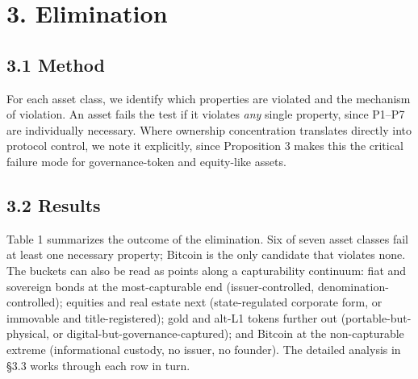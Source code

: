 \documentclass[12pt]{article}
\theoremstyle{definition}
\theoremstyle{remark}
\begin{document}
\section{3. Elimination}

\subsection{3.1 Method}

For each asset class, we identify which properties are violated and the
mechanism of violation. An asset fails the test if it violates
\emph{any} single property, since P1--P7 are individually necessary.
Where ownership concentration translates directly into protocol
control, we note it explicitly, since Proposition 3 makes this the
critical failure mode for governance-token and equity-like assets.

\subsection{3.2 Results}

Table 1 summarizes the outcome of the elimination. Six of seven asset
classes fail at least one necessary property; Bitcoin is the only
candidate that violates none. The buckets can also be read as points
along a capturability continuum: fiat and sovereign bonds at the
most-capturable end (issuer-controlled, denomination-controlled);
equities and real estate next (state-regulated corporate form, or
immovable and title-registered); gold and alt-L1 tokens further out
(portable-but-physical, or digital-but-governance-captured); and
Bitcoin at the non-capturable extreme (informational custody, no
issuer, no founder). The detailed analysis in \S3.3 works through
each row in turn.
\end{document}
